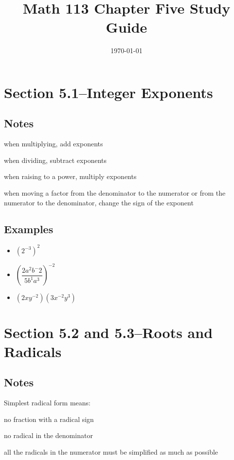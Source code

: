 \documentclass[fleqn,addpoints]{exam}
\title{Math 113 Chapter Five Study Guide}
\author{}
\date{\today}
\begin{document}
\maketitle

\section{Section 5.1--Integer Exponents}

\subsection{Notes}
\begin{itemize*}
   \item when multiplying, add exponents 
   \item when dividing, subtract exponents 
   \item when raising to a power, multiply exponents 
   \item when moving a factor from the denominator to the numerator or from the numerator to the denominator, change the
     sign of the exponent 
\end{itemize*}

\subsection{Examples}
\begin{itemize}
  \item \( (2^{-3})^2 \)
  \item \( \left( \dfrac{2a^2b^-2}{5b^{1}a^3} \right)^{-2} \)
  \item \( (2xy^{-2})(3x^{-2}y^3) \)
\end{itemize}

\section{Section 5.2 and 5.3--Roots and Radicals}

\subsection{Notes}
Simplest radical form means:
\begin{itemize*}
    \item no fraction with a radical sign
    \item no radical in the denominator
    \item all the radicals in the numerator must be simplified as much as possible
\end{itemize*}
\end{document}
